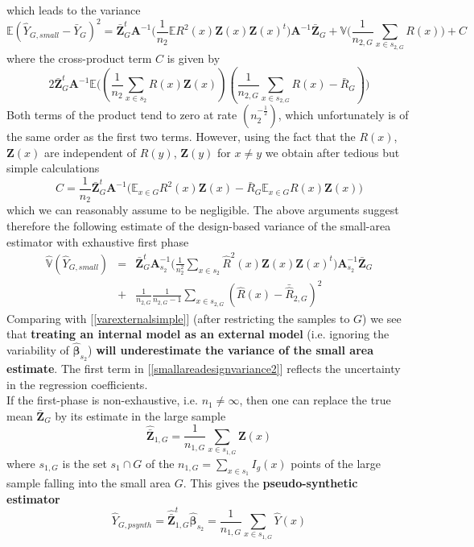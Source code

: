 \documentclass[a4paper,12pt,leqno, titlepage]{article}
\newcommand{\EX}{\mathbb{E}}
\newcommand{\VAR}{\mathbb{V}}
\begin{document}
which leads to the variance
\begin{equation}\label{smallvar1}
\EX(\hat{Y}_{G,small}-\bar{Y}_G)^2=
\bar{\pmb{Z}}^t_G\pmb{A}^{-1}\Big(\frac{1}{n_2}\EX R^2(x)\pmb{Z}(x)\pmb{Z}(x)^t\Big)\pmb{A}^{-1}\bar{\pmb{Z}}_G + \VAR \big(\frac{1}{n_{2,G}}\sum_{x\in{s_{2,G}}}R(x)\big )+ C
\end{equation}
\noindent where the cross-product term $C$ is given by
$$2\bar{\pmb{Z}}^t_G\pmb{A}^{-1}\EX\big( (\frac{1}{n_2}\sum_{x\in{s_2}}R(x)\pmb{Z}(x))
(\frac{1}{n_{2,G}}\sum_{x\in{s_{2,G}}}R(x)-\bar{R}_G)\big)$$
Both terms of the product tend to zero at rate $(n_2^{-\frac{1}{2}})$, which unfortunately is of the same order as the first two terms. However, using the fact that the $R(x)$, $\pmb{Z}(x)$ are independent of $R(y)$, $\pmb{Z}(y)$ for $x\ne y$ we obtain after tedious but simple calculations
$$C=\frac{1}{n_2}\bar{\pmb{Z}}^t_G\pmb{A}^{-1}\big(\EX_{x\in{G}}R^2(x)\pmb{Z}(x)-\bar{R}_G\EX_{x\in{G}}R(x)\pmb{Z}(x)\Big)$$
which we can reasonably assume to be negligible. The above arguments suggest therefore the following estimate of the design-based variance of the small-area estimator with exhaustive first phase
\begin{eqnarray}\label{smallareadesignvariance2}
\hat{\VAR}(\hat{Y}_{G,small})&=&
\bar{\pmb{Z}}^t_G\pmb{A}_{s_2}^{-1}\Big(\frac{1}{n^2_2}\sum_{x\in{s_2}} \hat{R}^2(x)\pmb{Z}(x)\pmb{Z}(x)^t\Big)\pmb{A}_{s_2}^{-1}\bar{\pmb{Z}}_G \\ \nonumber &+&
\frac{1}{n_{2,G}}\frac{1}{n_{2,G}-1}\sum_{x\in{s_{2,G}}}(\hat{R}(x)-\bar{\hat{R}}_{2,G})^2
\end{eqnarray}
Comparing with [\ref{varexternalsimple}] (after restricting the samples to $G$) we see that \textbf{treating an internal model as an external model} (i.e. ignoring the variability of $\hat{\pmb{\beta}}_{s_2}$) \textbf{ will underestimate the variance of the small area estimate}. The first term in [\ref{smallareadesignvariance2}] reflects the uncertainty in the regression coefficients.\\
If the first-phase is non-exhaustive, i.e. $n_1 \ne \infty$, then one can replace the true mean $\bar{\pmb{Z}}_G$ by its estimate in the large sample
$$\hat{\bar{\pmb{Z}}}_{1,G}=\frac{1}{n_{1,G}}\sum_{x\in{s_{1,G}}}\pmb{Z}(x)$$ where $s_{1,G}$ is the set $s_1\cap G$ of the $n_{1,G}=\sum_{x\in{s_1}}I_g(x)$ points of the large sample falling into the small area $G$. This gives the \textbf{pseudo-synthetic estimator}
\begin{equation}\label{pseudosynth1}
\hat{Y}_{G,psynth}=\hat{\bar{\pmb{Z}}}_{1,G}^t\hat{\pmb{\beta}}_{s_2}
=\frac{1}{n_{1,G}}\sum_{x\in{s_{1,G}}}\hat{Y}(x)
\end{equation}
\end{document}
